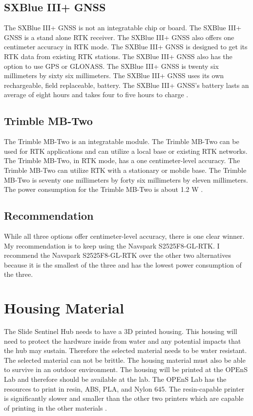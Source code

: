 \documentclass[onecolumn, draftclsnofoot,10pt, compsoc]{IEEEtran}
\begin{document}
    \subsection{SXBlue III+ GNSS}
        The SXBlue III+ GNSS is not an integratable chip or board. The SXBlue III+ GNSS is a stand alone RTK receiver. The SXBlue III+ GNSS also offers one centimeter accuracy in RTK mode. The SXBlue III+ GNSS is designed to get its RTK data from existing RTK stations. The SXBlue III+ GNSS also has the option to use GPS or GLONASS. The SXBlue III+ GNSS is twenty six millimeters by sixty six millimeters. The SXBlue III+ GNSS uses its own rechargeable, field replaceable, battery. The SXBlue III+ GNSS's battery lasts an average of eight hours and takes four to five hours to charge \cite{website:SXB}.
    \subsection{Trimble MB-Two}
        The Trimble MB-Two is an integratable module. The Trimble MB-Two can be used for RTK applications and can utilize a local base or existing RTK networks. The Trimble MB-Two, in RTK mode, has a one centimeter-level accuracy. The Trimble MB-Two can utilize RTK with a stationary or mobile base. The Trimble MB-Two is seventy one millimeters by forty six millimeters by eleven millimeters. The power consumption for the Trimble MB-Two is about 1.2 W \cite{website:Trimble}.
    \subsection{Recommendation}
        While all three options offer centimeter-level accuracy, there is one clear winner. My recommendation is to keep using the Navspark S2525F8-GL-RTK. I recommend the Navspark S2525F8-GL-RTK over the other two alternatives because it is the smallest of the three and has the lowest power consumption of the three. 
    
\section{Housing Material}
    The Slide Sentinel Hub needs to have a 3D printed housing. This housing will need to protect the hardware inside from water and any potential impacts that the hub may sustain. Therefore the selected material needs to be water resistant. The selected material can not be brittle. The housing material must also be able to survive in an outdoor environment. The housing will be printed at the OPEnS Lab and therefore should be available at the lab. The OPEnS Lab has the resources to print in resin, ABS, PLA, and Nylon 645. The resin-capable printer is significantly slower and smaller than the other two printers which are capable of printing in the other materials \cite{website:OPEnS_Resources}.
\end{document}
